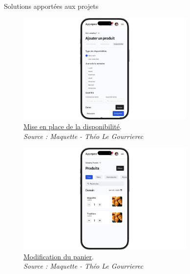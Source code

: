 \documentclass{beamer}
\begin{document}
\begin{frame}{Solutions apportées aux projets}
\begin{center}
		 {
			\addtocounter{figure}{1}
			\begin{figure}[t]
  				\includegraphics[height=5.5cm]{../img/maquette/disponibilite_produit.png}
				\caption{	
					\centering			
  					\href{https://github.com/Matteo-K/Soutenance_E-delic/blob/main/img/maquette/disponibilite_produit.png}{\underline{Mise en place de la disponibilité}}.\\
  					\textit{Source : Maquette - Théo Le Gourrierec}
				}
  				\label{fig:disponibilite_produit}
  			\end{figure}
		}
		
		\only<7> {
			\addtocounter{figure}{2}
			\begin{figure}[t]
  				\includegraphics[height=5.5cm]{../img/maquette/controlle_acces_client.png}
				\caption{
					\centering
  					\href{https://github.com/Matteo-K/Soutenance_E-delic/blob/main/img/maquette/controlle_acces_client.png}{\underline{Modification du panier}}.\\
  					\textit{Source : Maquette - Théo Le Gourrierec}
				}
  				\label{fig:modification_panier}
  			\end{figure}
		}
		

\end{center}
\end{frame}
\end{document}
